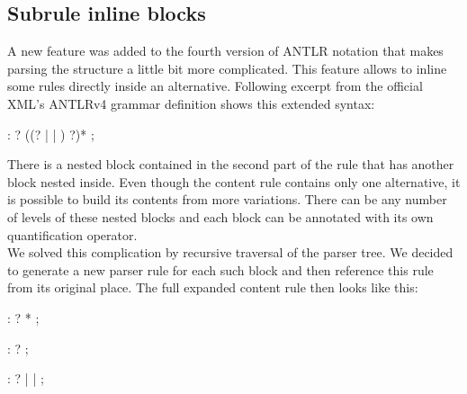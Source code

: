 \subsection{Subrule inline blocks}

A new feature was added to the fourth version of ANTLR notation that makes parsing the structure a little bit more complicated. This feature allows to inline some rules directly inside an alternative. Following excerpt from the official XML's ANTLRv4 grammar definition shows this extended syntax:

\begin{antlr}
	 :   ? ((? |  | ) ?)* ;
\end{antlr}

There is a nested block contained in the second part of the rule that has another block nested inside. Even though the content rule contains only one alternative, it is possible to build its contents from more variations. There can be any number of levels of these nested blocks and each block can be annotated with its own quantification operator. 
\\

We solved this complication by recursive traversal of the parser tree. We decided to generate a new parser rule for each such block and then reference this rule from its original place. The full expanded content rule then looks like this:

\begin{antlr}
	 :   ? * ;
	
	 :    ? ;
	
	 :   ? 
	|    
	|   
	;
\end{antlr}